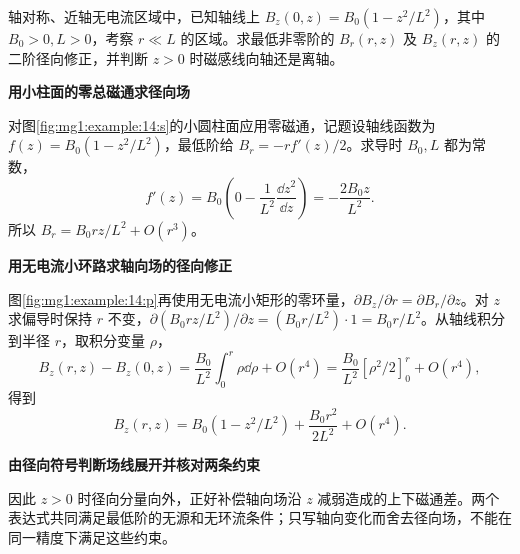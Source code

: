 \begin{question}\begin{example}[由轴线函数重建近轴磁场]\label{mg1:example:14}
轴对称、近轴无电流区域中，已知轴线上 $B_z(0,z)=B_0(1-z^2/L^2)$，其中 $B_0>0,L>0$，考察 $r\ll L$ 的区域。求最低非零阶的 $B_r(r,z)$ 及 $B_z(r,z)$ 的二阶径向修正，并判断 $z>0$ 时磁感线向轴还是离轴。
\end{example}
\end{question}
\begin{solution}\textbf{用小柱面的零总磁通求径向场}\par\nobreak
对图\ref{fig:mg1:example:14:s}的小圆柱面应用零磁通，记题设轴线函数为 $f(z)=B_0(1-z^2/L^2)$，最低阶给 $B_r=-rf\prime(z)/2$。求导时 $B_0,L$ 都为常数，
\[
 f'(z)=B_0\left(0-\frac1{L^2}\frac{\dd z^2}{\dd z}\right)
 =-\frac{2B_0z}{L^2}.
\]
所以 $B_r=B_0rz/L^2+O(r^3)$。



\par\medskip{}\noindent\textbf{用无电流小环路求轴向场的径向修正}\par\nobreak
图\ref{fig:mg1:example:14:p}再使用无电流小矩形的零环量，$\partial B_z/\partial r=\partial B_r/\partial z$。对 $z$ 求偏导时保持 $r$ 不变，$\partial(B_0rz/L^2)/\partial z=(B_0r/L^2)\cdot1=B_0r/L^2$。从轴线积分到半径 $r$，取积分变量 $\rho$，
\[
 B_z(r,z)-B_z(0,z)
 =\frac{B_0}{L^2}\int_0^r\rho\dd\rho+O(r^4)
 =\frac{B_0}{L^2}[\rho^2/2]_0^r+O(r^4),
\]
得到
\[
B_z(r,z)=B_0(1-z^2/L^2)+\frac{B_0r^2}{2L^2}+O(r^4).
\]


\par\medskip{}\noindent\textbf{由径向符号判断场线展开并核对两条约束}\par\nobreak
因此 $z>0$ 时径向分量向外，正好补偿轴向场沿 $z$ 减弱造成的上下磁通差。两个表达式共同满足最低阶的无源和无环流条件；只写轴向变化而舍去径向场，不能在同一精度下满足这些约束。\end{solution}
